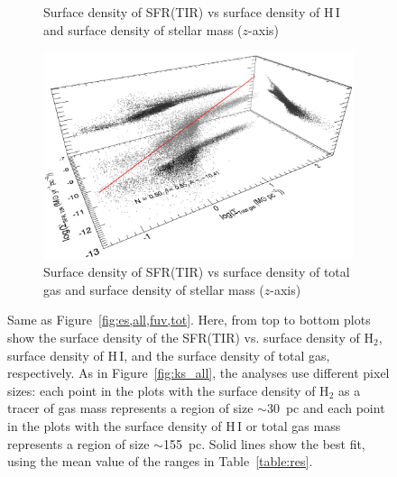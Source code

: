 \begin{figure}
\begin{subfigure}[b]{0.5\textwidth}
        \caption{Surface density of SFR(TIR) vs surface density of H\,{\sc I} and surface density of stellar mass ($z$-axis) }
        \label{fig:es,all,fir,hi}
    \end{subfigure}
    \hfill
   \begin{subfigure}[b]{0.5\textwidth}
        \centering
        \includegraphics[width=\textwidth]{../image_paper1/es_tot_fir_vs_tot2_f.png}
        \caption{Surface density of SFR(TIR) vs surface density of total gas and surface density of stellar mass ($z$-axis)}
        \label{fig:es,all,fir,tot}
    \end{subfigure}
       \caption{Same as Figure~\ref{fig:es,all,fuv,tot}. Here, from top to bottom plots show the surface density of the SFR(TIR) vs. surface density of H$_2$, surface density of H\,{\sc I}, and the surface density of total gas, respectively. As in Figure~\ref{fig:ks_all}, the analyses use different pixel sizes: each point in the plots with the surface density of H$_2$ as a tracer of gas mass represents a region of size $\sim$30~pc and each point in the plots with the surface density of H\,{\sc I} or total gas mass represents a region of size $\sim$155~pc. Solid lines show the best fit, using the mean value of the ranges in Table~\ref{table:res}.}
       \label{fig:es,fir}
\end{figure}


